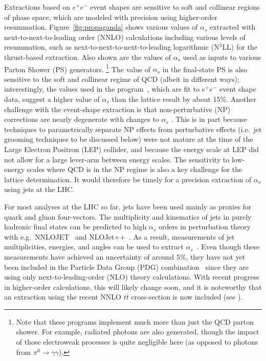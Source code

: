 Extractions based on $e^+e^-$ event shapes are sensitive to soft and collinear regions of phase space, which are modeled with precision
using higher-order resummation.
%
Figure~\ref{fig:propaganda} shows various values of $\alpha_s$ extracted with next-to-next-to-leading order (NNLO) calculations including various levels of resummation, such as next-to-next-to-next-to-leading logarithmic (N$^3$LL) for the thrust-based extraction.
%
Also shown are the values of $\alpha_s$ used as inputs to various Parton Shower (PS) generators.%
\footnote{Note that these programs implement much more than just the QCD parton shower.  For example, radiated photons are also generated, though the impact of those electroweak processes is quite negligible here (as opposed to photons from $\pi^0\rightarrow\gamma\gamma$).}
%
The value of $\alpha_s$ in the final-state PS is also sensitive to the soft and collinear regime of QCD (albeit in different ways); interestingly, the values used in the \pythia program~\cite{Sjostrand:2006za,Sjostrand:2007gs}, which are fit to $e^+e^-$ event shape data, suggest a higher value of $\alpha_s$ than the lattice result by about 15\%.
%
Another challenge with the event-shape extraction is that non-perturbative (NP) corrections are nearly degenerate with changes to $\alpha_s$ \cite{Abbate:2010xh}.
%
This is in part because techniques to parametrically separate NP effects from perturbative effects (i.e.~jet grooming techniques to be discussed below) were not mature at the time of the Large Electron Positron (LEP) collider, and because the energy scale at LEP did not allow for a large lever-arm between energy scales.
%
The sensitivity to low-energy scales where QCD is in the NP regime is also a key challenge for the lattice determination.
%
It would therefore be timely for a precision extraction of $\alpha_s$ using jets at the LHC.

For most analyses at the LHC so far, jets have been used mainly as proxies for quark and gluon four-vectors.
%
The multiplicity and kinematics of jets in purely hadronic final states can be predicted to high $\alpha_s$ orders in perturbation theory with e.g.\ NNLOJET~\cite{Currie:2016bfm,Currie:2017ctp} and NLOJet++~\cite{Nagy:2001fj,Nagy:2003tz}.
%
As a result, measurements of jet multiplicities, energies, and angles can be used to extract $\alpha_s$~\cite{ATLAS:2015yaa,Aaboud:2017fml,Khachatryan:2014waa,CMS:2014mna,Chatrchyan:2013txa}.
%
Even though these measurements have achieved an uncertainty of around $5\%$, they have not yet been included in the Particle Data Group (PDG) combination~\cite{Olive:2016xmw} since they are using only next-to-leading-order (NLO) theory calculations.
%
With recent progress in higher-order calculations, this will likely change soon, and it is noteworthy that an extraction using the recent NNLO $t\bar{t}$ cross-section \cite{Czakon:2013goa} is now included (see ).

